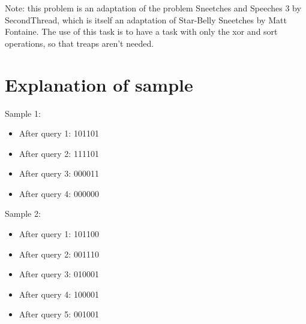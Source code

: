 Note: this problem is an adaptation of the problem Sneetches and Speeches 3 by SecondThread, which is itself
an adaptation of Star-Belly Sneetches by Matt Fontaine. The use of this task is to have a task with only the
xor and sort operations, so that treaps aren't needed.

\section*{Explanation of sample}
Sample 1:
\begin{itemize}
  \item After query 1: 101101
  \item After query 2: 111101
  \item After query 3: 000011
  \item After query 4: 000000
\end{itemize}


Sample 2:
\begin{itemize}
  \item After query 1: 101100
  \item After query 2: 001110
  \item After query 3: 010001
  \item After query 4: 100001
  \item After query 5: 001001
\end{itemize}

